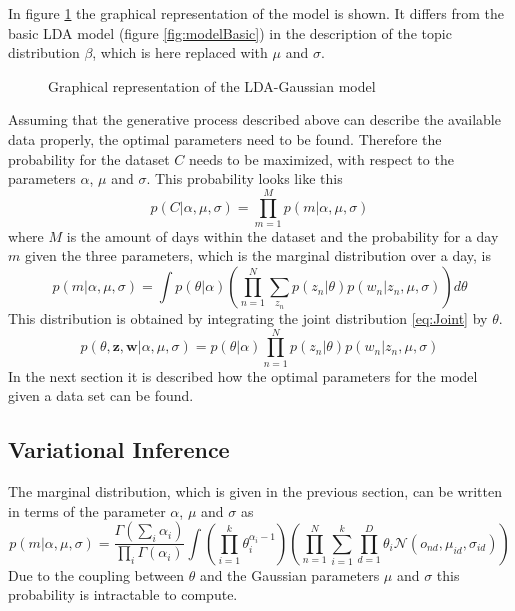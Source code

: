 In figure \ref{fig:modelExt} the graphical representation of the model is shown. It differs from the basic LDA model (figure \ref{fig:modelBasic}) in the description of the topic distribution $\beta$, which is here replaced with $\mu$ and $\sigma$.

\begin{figure}[h!]
\centering
\def\svgwidth{0.8\textwidth}

\caption{Graphical representation of the LDA-Gaussian model}
\label{fig:modelExt}
\end{figure}




  
Assuming that the generative process described above can describe the available data properly, the optimal parameters need to be found. Therefore the probability for the dataset $C$ needs to be maximized, with respect to the parameters $\alpha$, $\mu$ and $\sigma$.
This probability looks like this
\begin{equation}
p(C|\alpha,\mu,\sigma) = \prod_{m=1}^M p(m|\alpha,\mu,\sigma)
\end{equation}
where $M$ is the amount of days within the dataset and the probability for a day $m$ given the three parameters, which is the marginal distribution over a day, is
\begin{equation} 
p(m|\alpha,\mu,\sigma) = \int p(\theta|\alpha)  \left( \prod_{n=1}^N \sum_{z_n} p(z_n|\theta) p(w_n|z_n, \mu,\sigma)  \right) d\theta
\end{equation}
This distribution is obtained by integrating the joint distribution \ref{eq:Joint} by $\theta$.
\begin{equation} \label{eq:Joint}
 p(\theta,\textbf{z},\textbf{w}|\alpha,\mu,\sigma) = p(\theta|\alpha) \prod_{n=1}^N p(z_n|\theta) p(w_n|z_n,\mu,\sigma)
\end{equation}
In the next section it is described how the optimal parameters for the model given a data set can be found.


  
\subsection{Variational Inference}
 
The marginal distribution, which is given in the previous section, can be written in terms of the parameter $\alpha$, $\mu$ and $\sigma$ as
  \begin{equation}
   p(m|\alpha,\mu,\sigma) = \frac{\Gamma (\sum_i \alpha_i)}{\prod_i \Gamma(\alpha_i)} \int \left( \prod_{i=1}^k \theta_i^{\alpha_i-1} \right)
   \left( \prod_{n=1}^N \sum_{i=1}^k \prod_{d=1}^D \theta_i \mathcal{N}(o_{nd},\mu_{id},\sigma_{id} ) \right)
  \end{equation}
Due to the coupling between $\theta$ and the Gaussian parameters $\mu$ and $\sigma$ this probability is intractable to compute.	




